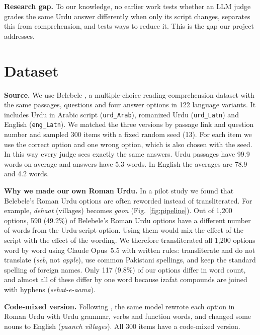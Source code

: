 \documentclass[conference]{IEEEtran}
\newcommand{\rom}[1]{\textit{#1}}  %
\begin{document}
\textbf{Research gap.} To our knowledge, no earlier work tests whether an LLM judge grades the same Urdu answer
differently when only its script changes, separates this from comprehension, and tests ways to reduce it. This is the
gap our project addresses.



\section{Dataset}
\label{sec:data}
\textbf{Source.} We use Belebele \cite{bandarkar2024belebele}, a multiple-choice reading-comprehension dataset with the
same passages, questions and four answer options in 122 language variants. It includes Urdu in Arabic script
(\texttt{urd\_Arab}), romanized Urdu (\texttt{urd\_Latn}) and English (\texttt{eng\_Latn}). We matched the three
versions by passage link and question number and sampled 300 items with a fixed random seed (13). For each item we use
the correct option and one wrong option, which is also chosen with the seed. In this way every judge sees exactly the
same answers. Urdu passages have 99.9 words on average and answers have 5.3 words. In English the averages are 78.9
and 4.2 words.

\textbf{Why we made our own Roman Urdu.} In a pilot study we found that Belebele's Roman Urdu options are often
reworded instead of transliterated. For example, \rom{dehaat} (villages) becomes \rom{gaon} (Fig.~\ref{fig:pipeline}).
Out of 1{,}200 options, 590 (49.2\%) of Belebele's Roman Urdu options have a different number of words from the
Urdu-script option. Using them would mix the effect of the script with the effect of the wording. We therefore
transliterated all 1{,}200 options word by word using Claude Opus~5.5 with written rules: transliterate and do not
translate (\rom{seb}, not \rom{apple}), use common Pakistani spellings, and keep the standard spelling of foreign names.
Only 117 (9.8\%) of our options differ in word count, and almost all of these differ by one word because izafat
compounds are joined with hyphens (\rom{sehat-e-aama}).

\textbf{Code-mixed version.} Following \cite{mohamed2025lost}, the same model rewrote each option in Roman Urdu with
Urdu grammar, verbs and function words, and changed some nouns to English (\rom{paanch villages}). All 300 items have a
code-mixed version.
\end{document}
